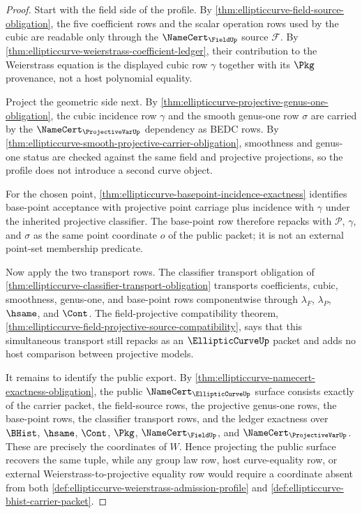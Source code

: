 \begin{proof}
Start with the field side of the profile. By \autoref{thm:ellipticcurve-field-source-obligation}, the five coefficient rows and the scalar operation rows used by the cubic are readable only through the $\NameCert_{\FieldUp}$ source $\mathcal{F}$. By \autoref{thm:ellipticcurve-weierstrass-coefficient-ledger}, their contribution to the Weierstrass equation is the displayed cubic row $\gamma$ together with its $\Pkg$ provenance, not a host polynomial equality.

Project the geometric side next. By \autoref{thm:ellipticcurve-projective-genus-one-obligation}, the cubic incidence row $\gamma$ and the smooth genus-one row $\sigma$ are carried by the $\NameCert_{\ProjectiveVarUp}$ dependency as BEDC rows. By \autoref{thm:ellipticcurve-smooth-projective-carrier-obligation}, smoothness and genus-one status are checked against the same field and projective projections, so the profile does not introduce a second curve object.

For the chosen point, \autoref{thm:ellipticcurve-basepoint-incidence-exactness} identifies base-point acceptance with projective point carriage plus incidence with $\gamma$ under the inherited projective classifier. The base-point row therefore repacks with $\mathcal{P}$, $\gamma$, and $\sigma$ as the same point coordinate $o$ of the public packet; it is not an external point-set membership predicate.

Now apply the two transport rows. The classifier transport obligation of \autoref{thm:ellipticcurve-classifier-transport-obligation} transports coefficients, cubic, smoothness, genus-one, and base-point rows componentwise through $\lambda_F$, $\lambda_P$, $\hsame$, and $\Cont$. The field-projective compatibility theorem, \autoref{thm:ellipticcurve-field-projective-source-compatibility}, says that this simultaneous transport still repacks as an $\EllipticCurveUp$ packet and adds no host comparison between projective models.

It remains to identify the public export. By \autoref{thm:ellipticcurve-namecert-exactness-obligation}, the public $\NameCert_{\EllipticCurveUp}$ surface consists exactly of the carrier packet, the field-source rows, the projective genus-one rows, the base-point rows, the classifier transport rows, and the ledger exactness over $\BHist$, $\hsame$, $\Cont$, $\Pkg$, $\NameCert_{\FieldUp}$, and $\NameCert_{\ProjectiveVarUp}$. These are precisely the coordinates of $W$. Hence projecting the public surface recovers the same tuple, while any group law row, host curve-equality row, or external Weierstrass-to-projective equality row would require a coordinate absent from both \autoref{def:ellipticcurve-weierstrass-admission-profile} and \autoref{def:ellipticcurve-bhist-carrier-packet}.
\end{proof}
